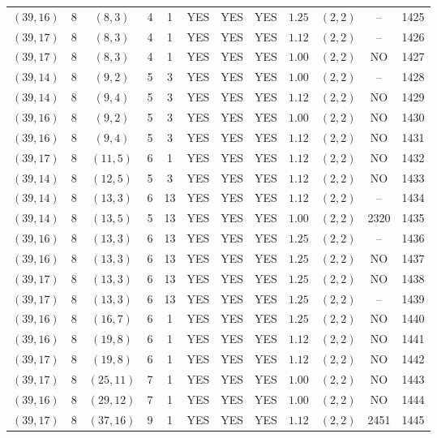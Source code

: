 \begin{longtable}{|c|c|c|c|c|c|c|c|c|c|c|c|}
$(39,16)$ & 8 & $(8,3)$ & 4 & 1 & YES & YES & YES & $1.25$ & $(2,2)$ & -- & 1425\\
$(39,17)$ & 8 & $(8,3)$ & 4 & 1 & YES & YES & YES & $1.12$ & $(2,2)$ & -- & 1426\\
$(39,17)$ & 8 & $(8,3)$ & 4 & 1 & YES & YES & YES & $1.00$ & $(2,2)$ & NO & 1427\\
$(39,14)$ & 8 & $(9,2)$ & 5 & 3 & YES & YES & YES & $1.00$ & $(2,2)$ & -- & 1428\\
$(39,14)$ & 8 & $(9,4)$ & 5 & 3 & YES & YES & YES & $1.12$ & $(2,2)$ & NO & 1429\\
$(39,16)$ & 8 & $(9,2)$ & 5 & 3 & YES & YES & YES & $1.00$ & $(2,2)$ & NO & 1430\\
$(39,16)$ & 8 & $(9,4)$ & 5 & 3 & YES & YES & YES & $1.12$ & $(2,2)$ & NO & 1431\\
$(39,17)$ & 8 & $(11,5)$ & 6 & 1 & YES & YES & YES & $1.12$ & $(2,2)$ & NO & 1432\\
$(39,14)$ & 8 & $(12,5)$ & 5 & 3 & YES & YES & YES & $1.12$ & $(2,2)$ & NO & 1433\\
$(39,14)$ & 8 & $(13,3)$ & 6 & 13 & YES & YES & YES & $1.12$ & $(2,2)$ & -- & 1434\\
$(39,14)$ & 8 & $(13,5)$ & 5 & 13 & YES & YES & YES & $1.00$ & $(2,2)$ & 2320 & 1435\\
$(39,16)$ & 8 & $(13,3)$ & 6 & 13 & YES & YES & YES & $1.25$ & $(2,2)$ & -- & 1436\\
$(39,16)$ & 8 & $(13,3)$ & 6 & 13 & YES & YES & YES & $1.25$ & $(2,2)$ & NO & 1437\\
$(39,17)$ & 8 & $(13,3)$ & 6 & 13 & YES & YES & YES & $1.25$ & $(2,2)$ & NO & 1438\\
$(39,17)$ & 8 & $(13,3)$ & 6 & 13 & YES & YES & YES & $1.25$ & $(2,2)$ & -- & 1439\\
$(39,16)$ & 8 & $(16,7)$ & 6 & 1 & YES & YES & YES & $1.25$ & $(2,2)$ & NO & 1440\\
$(39,16)$ & 8 & $(19,8)$ & 6 & 1 & YES & YES & YES & $1.12$ & $(2,2)$ & NO & 1441\\
$(39,17)$ & 8 & $(19,8)$ & 6 & 1 & YES & YES & YES & $1.12$ & $(2,2)$ & NO & 1442\\
$(39,17)$ & 8 & $(25,11)$ & 7 & 1 & YES & YES & YES & $1.00$ & $(2,2)$ & NO & 1443\\
$(39,16)$ & 8 & $(29,12)$ & 7 & 1 & YES & YES & YES & $1.00$ & $(2,2)$ & NO & 1444\\
$(39,17)$ & 8 & $(37,16)$ & 9 & 1 & YES & YES & YES & $1.12$ & $(2,2)$ & 2451 & 1445\\

\end{longtable}
